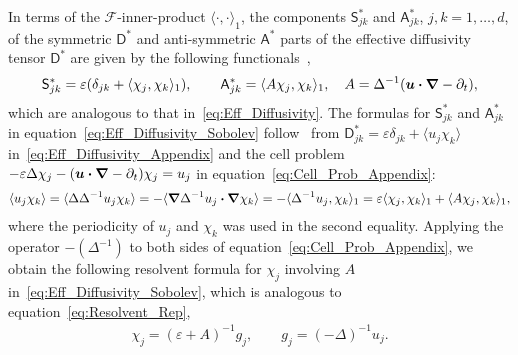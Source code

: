 \documentclass[leqno,onefignum,onetabnum]{siamltex1213}
\newcommand{\Dm}{\mathsf{D}}
\newcommand{\Sm}{\mathsf{S}}
\newcommand{\Am}{\mathsf{A}}
\newcommand{\Fs}{\mathscr{F}}
\newcommand\bnabla{\mbox{\boldmath${\nabla}$}}
\providecommand\bcdot{\boldsymbol{\cdot}}
\newcommand{\vecu}{\boldsymbol{u}}
\begin{document}
In terms of the $\Fs$-inner-product $\langle\cdot,\cdot\rangle_1$, the components
$\Sm^*_{jk}$ and $\Am^*_{jk}$, $j,k=1,\ldots,d$, of the symmetric $\Dm^*$
and anti-symmetric $\Am^*$ parts of the effective diffusivity
tensor $\Dm^*$ are given by the following
functionals~\cite{Pavliotis:PHD_Thesis},    
%
\begin{align}%
  \Sm^*_{jk}=\varepsilon(\delta_{jk}+\langle\chi_j,\chi_k\rangle_1), \qquad
  \Am^*_{jk}=\langle A\chi_j,\chi_k\rangle_1, \quad
  A=\Delta^{-1}(\vecu \bcdot\bnabla -\partial_t),
\end{align}
%
which are analogous to that in~\eqref{eq:Eff_Diffusivity}.
The formulas for $\Sm^*_{jk}$ and $\Am^*_{jk}$ in
equation~\eqref{eq:Eff_Diffusivity_Sobolev}
follow~\cite{Pavliotis:PHD_Thesis}  
from $\Dm^*_{jk}=\varepsilon\delta_{jk}+\langle u_j\chi_k\rangle$
in~\eqref{eq:Eff_Diffusivity_Appendix} and the cell problem 
$-\varepsilon\Delta\chi_j-(\vecu \bcdot\bnabla -\partial_t)\chi_j=u_j$ in
equation~\eqref{eq:Cell_Prob_Appendix}:  
%
\begin{align}
  \langle u_j\chi_k\rangle=\langle\Delta\Delta^{-1}u_j\chi_k\rangle
       =-\langle\bnabla \Delta^{-1}u_j\bcdot\bnabla \chi_k\rangle
       =-\langle\Delta^{-1}u_j,\chi_k\rangle_1
       =\varepsilon\langle\chi_j,\chi_k\rangle_1+\langle A\chi_j,\chi_k\rangle_1,
\end{align}
%
where the periodicity of $u_j$ and $\chi_k$ was used in the second equality.
Applying the operator $-(\Delta^{-1})$ to both sides of
equation~\eqref{eq:Cell_Prob_Appendix}, we obtain the following
resolvent 
formula for $\chi_j$ involving $A$ in~\eqref{eq:Eff_Diffusivity_Sobolev},
which is analogous to equation~\eqref{eq:Resolvent_Rep},   
%
\begin{align}%
  \chi_j=(\varepsilon+A)^{-1}g_j, \qquad 
  g_j=(-\Delta)^{-1}u_j.
\end{align}
%
\end{document}
